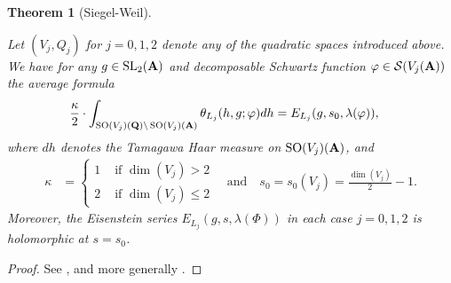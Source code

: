 \documentclass{amsart}
\newtheorem{theorem}{Theorem}[section]
\theoremstyle{definition}
\begin{document}
\begin{theorem}[Siegel-Weil]\label{SW-abstract} 

Let $(V_j, Q_j)$ for $j=0, 1,2$ denote any of the quadratic spaces introduced above. 
We have for any $g \in \operatorname{SL}_2({\bf{A}})$ and decomposable Schwartz function
$\varphi \in \mathcal{S}(V_j({\bf{A}}))$ the average formula
\begin{align*} \frac{\kappa}{2} \cdot \int_{ \operatorname{SO}(V_j)({\bf{Q}}) \backslash \operatorname{SO}(V_j)({\bf{A}}) } 
\theta_{L_j}(h, g; \varphi) dh 
&= E_{L_j}(g, s_0, \lambda(\varphi)), \end{align*} 
where $dh$ denotes the Tamagawa Haar measure on $\operatorname{SO}(V_j)({\bf{A}})$, and 
\begin{align*} \kappa &= \begin{cases} 1 &\text{ if $\dim(V_j) > 2$} \\ 2 &\text{ if $\dim(V_j) \leq 2$}  \end{cases}
\quad \text{and} \quad s_0 = s_0(V_j) = \frac{\dim(V_j)}{2} -1. \end{align*}
Moreover, the Eisenstein series $E_{L_j}(g, s, \lambda(\Phi))$ in each case $j=0,1,2$ is holomorphic at $s = s_0$. \end{theorem}

\begin{proof} See \cite[Theorem 4.1]{KuBL}, and more generally \cite[$\S$ I.4]{Ku2}. \end{proof}
\end{document}
